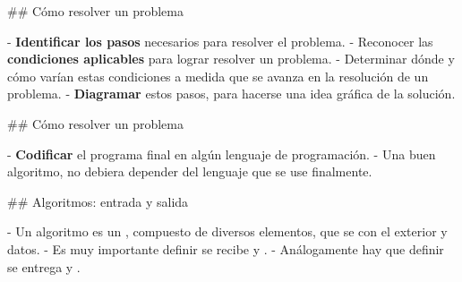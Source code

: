 ## Cómo resolver un problema


\vfill

- \textbf{Identificar los pasos} necesarios para resolver el problema.
- Reconocer las \textbf{condiciones aplicables} para lograr
resolver un problema.
    - Determinar dónde y cómo varían estas condiciones a medida que se avanza en la resolución de un problema.
- \textbf{Diagramar} estos pasos, para hacerse una idea gráfica de la solución.

## Cómo resolver un problema


\vfill

- \textbf{Codificar} el programa final en algún lenguaje de programación.
- Una buen algoritmo, no debiera depender del lenguaje que se use finalmente.


## Algoritmos: entrada y salida


- Un algoritmo es un , compuesto de diversos elementos, que se  con el exterior  y  datos.
- Es muy importante definir  se recibe y .
- Análogamente hay que definir  se entrega y .

\vfill

\begin{center}
\end{center}

